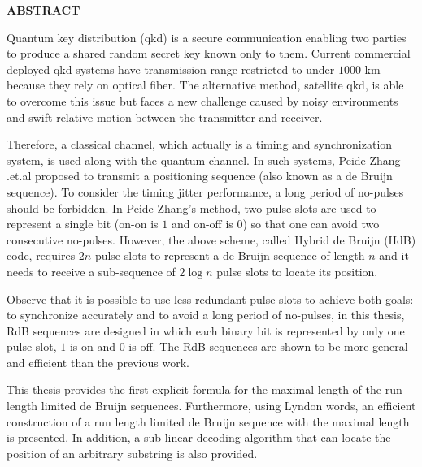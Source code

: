 \begin{center}
    \Large{\textbf{ABSTRACT}}\\
\end{center}
\vspace{1cm}

Quantum key distribution (\gls{qkd}) is a secure communication enabling two parties to produce a shared random secret key known only to them. Current commercial deployed \gls{qkd} systems have transmission range restricted to under $1000$ km because they rely on optical fiber. The alternative method, satellite \gls{qkd}, is able to overcome this issue but faces a new challenge caused by noisy environments and swift relative motion between the transmitter and receiver. 

Therefore, a classical channel, which actually is a timing and synchronization system, is used along with the quantum channel. In such systems, Peide Zhang .et.al proposed to transmit a positioning sequence (also known as a de Bruijn sequence). To consider the timing jitter performance, a long period of no-pulses should be forbidden. In Peide Zhang's method, two pulse slots are used to represent a single bit (on-on is $1$ and on-off is $0$) so that one can avoid two consecutive no-pulses. However, the above scheme, called Hybrid de Bruijn (\gls{HdB}) code, requires $2n$ pulse slots to represent a de Bruijn sequence of length $n$ and it needs to receive a sub-sequence of $2 \log n$ pulse slots to locate its position. 

Observe that it is possible to use less redundant pulse slots to achieve both goals: to synchronize accurately and to avoid a long period of no-pulses, in this thesis, \gls{RdB} sequences are designed in which each binary bit is represented by only one pulse slot, $1$ is on and $0$ is off. The \gls{RdB} sequences are shown to be more general and efficient than the previous work. 

This thesis provides the first explicit formula for the maximal length of the run length limited de Bruijn sequences. Furthermore, using Lyndon words, an efficient construction of a run length limited de Bruijn sequence with the maximal length is presented. In addition, a sub-linear decoding algorithm that can locate the position of an arbitrary substring is also provided. 

